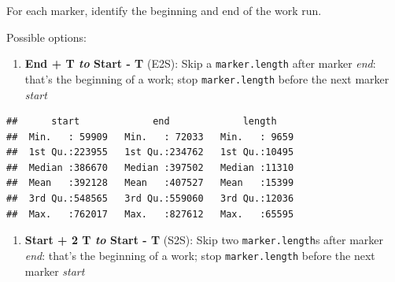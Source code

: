 \documentclass[]{article}
\newenvironment{Shaded}{\begin{snugshade}}{\end{snugshade}}
\newcommand{\KeywordTok}[1]{\textcolor[rgb]{0.13,0.29,0.53}{\textbf{{#1}}}}
\newcommand{\DataTypeTok}[1]{\textcolor[rgb]{0.13,0.29,0.53}{{#1}}}
\newcommand{\DecValTok}[1]{\textcolor[rgb]{0.00,0.00,0.81}{{#1}}}
\newcommand{\StringTok}[1]{\textcolor[rgb]{0.31,0.60,0.02}{{#1}}}
\newcommand{\NormalTok}[1]{{#1}}
\begin{document}
For each marker, identify the beginning and end of the work run.

Possible options:

\begin{enumerate}
\def\labelenumi{\arabic{enumi}.}
\itemsep1pt\parskip0pt
\item
  \textbf{End + T \emph{to} Start - T} (E2S): Skip a
  \texttt{marker.length} after marker \emph{end}: that's the beginning
  of a work; stop \texttt{marker.length} before the next marker
  \emph{start}
\end{enumerate}

\begin{Shaded}
\end{Shaded}

\begin{verbatim}
##      start             end             length     
##  Min.   : 59909   Min.   : 72033   Min.   : 9659  
##  1st Qu.:223955   1st Qu.:234762   1st Qu.:10495  
##  Median :386670   Median :397502   Median :11310  
##  Mean   :392128   Mean   :407527   Mean   :15399  
##  3rd Qu.:548565   3rd Qu.:559060   3rd Qu.:12036  
##  Max.   :762017   Max.   :827612   Max.   :65595
\end{verbatim}

\begin{enumerate}
\def\labelenumi{\arabic{enumi}.}
\setcounter{enumi}{1}
\itemsep1pt\parskip0pt
\item
  \textbf{Start + 2 T \emph{to} Start - T} (S2S): Skip two
  \texttt{marker.length}s after marker \emph{end}: that's the beginning
  of a work; stop \texttt{marker.length} before the next marker
  \emph{start}
\end{enumerate}

\begin{Shaded}
\end{Shaded}
\end{document}
